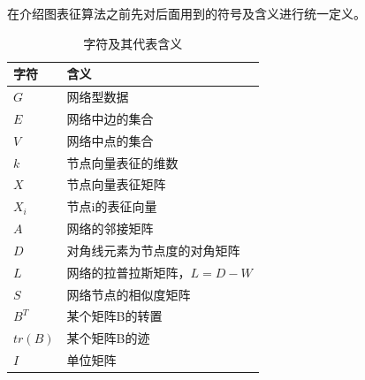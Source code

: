 在介绍图表征算法之前先对后面用到的符号及含义进行统一定义。
\begin{table}
	\centering
	\caption{字符及其代表含义}
	\begin{tabular}{|C{1.8in}|C{3.3in}|}
		\hline
		\textbf{字符} & \textbf{含义} \\ \hline\hline
		$G$ & 网络型数据 \\ \hline
		$E$ & 网络中边的集合 \\ \hline
		$V$& 网络中点的集合 \\ \hline
		$k$ & 节点向量表征的维数  \\ \hline
		$X$ & 节点向量表征矩阵 \\ \hline
		$X_i$ & 节点i的表征向量 \\ \hline
		$A$ & 网络的邻接矩阵 \\ \hline
		$D$ & 对角线元素为节点度的对角矩阵\\ \hline
		$L$ & 网络的拉普拉斯矩阵，$L=D-W$ \\ \hline
		$S$ & 网络节点的相似度矩阵 \\ \hline
		$B^T$ & 某个矩阵B的转置 \\ \hline
		$tr(B)$ & 某个矩阵B的迹 \\ \hline
		$I$ & 单位矩阵 \\ \hline
	\end{tabular}
\end{table}

